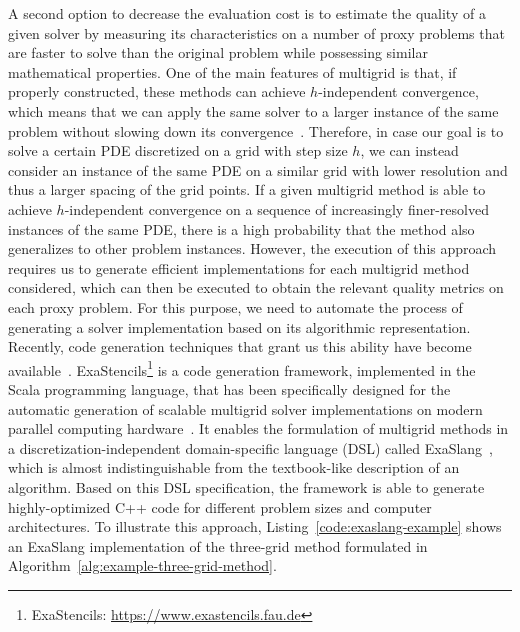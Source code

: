 A second option to decrease the evaluation cost is to estimate the quality of a given solver by measuring its characteristics on a number of proxy problems that are faster to solve than the original problem while possessing similar mathematical properties.
One of the main features of multigrid is that, if properly constructed, these methods can achieve $h$-independent convergence, which means that we can apply the same solver to a larger instance of the same problem without slowing down its convergence~\cite{trottenberg2000multigrid}.
Therefore, in case our goal is to solve a certain PDE discretized on a grid with step size $h$, we can instead consider an instance of the same PDE on a similar grid with lower resolution and thus a larger spacing of the grid points.
If a given multigrid method is able to achieve $h$-independent convergence on a sequence of increasingly finer-resolved instances of the same PDE, there is a high probability that the method also generalizes to other problem instances.
However, the execution of this approach requires us to generate efficient implementations for each multigrid method considered, which can then be executed to obtain the relevant quality metrics on each proxy problem.
For this purpose, we need to automate the process of generating a solver implementation based on its algorithmic representation.
Recently, code generation techniques that grant us this ability have become available~\cite{kostler2020code,schmitt2018automating}.
ExaStencils\footnote{ExaStencils: \url{https://www.exastencils.fau.de}} is a code generation framework, implemented in the Scala programming language, that has been specifically designed for the automatic generation of scalable multigrid solver implementations on modern parallel computing hardware~\cite{lengauer2014exastencils,lengauer2020exastencils}.
It enables the formulation of multigrid methods in a discretization-independent domain-specific language (DSL) called ExaSlang~\cite{schmitt2014exaslang,schmitt2016systems}, which is almost indistinguishable from the textbook-like description of an algorithm.
Based on this DSL specification, the framework is able to generate highly-optimized C++ code for different problem sizes and computer architectures.
To illustrate this approach, Listing~\ref{code:exaslang-example} shows an ExaSlang implementation of the three-grid method formulated in Algorithm~\ref{alg:example-three-grid-method}.
